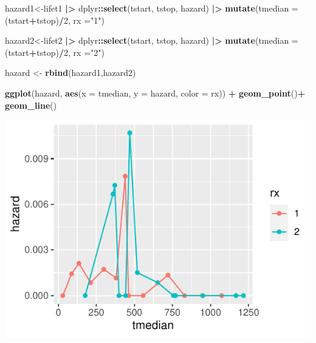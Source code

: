 \documentclass[
]{article}
\newenvironment{Shaded}{\begin{snugshade}}{\end{snugshade}}
\newcommand{\AttributeTok}[1]{\textcolor[rgb]{0.13,0.29,0.53}{#1}}
\newcommand{\DecValTok}[1]{\textcolor[rgb]{0.00,0.00,0.81}{#1}}
\newcommand{\FunctionTok}[1]{\textcolor[rgb]{0.13,0.29,0.53}{\textbf{#1}}}
\newcommand{\NormalTok}[1]{#1}
\newcommand{\OtherTok}[1]{\textcolor[rgb]{0.56,0.35,0.01}{#1}}
\newcommand{\SpecialCharTok}[1]{\textcolor[rgb]{0.81,0.36,0.00}{\textbf{#1}}}
\newcommand{\StringTok}[1]{\textcolor[rgb]{0.31,0.60,0.02}{#1}}
\begin{document}
\begin{Shaded}
\begin{Highlighting}[]
\NormalTok{hazard1}\OtherTok{\textless{}{-}}\NormalTok{lifet1 }\SpecialCharTok{|\textgreater{}}
\NormalTok{  dplyr}\SpecialCharTok{::}\FunctionTok{select}\NormalTok{(tstart, tstop, hazard) }\SpecialCharTok{|\textgreater{}}
  \FunctionTok{mutate}\NormalTok{(}\AttributeTok{tmedian =}\NormalTok{ (tstart}\SpecialCharTok{+}\NormalTok{tstop)}\SpecialCharTok{/}\DecValTok{2}\NormalTok{, }\AttributeTok{rx =}\StringTok{"1"}\NormalTok{)}

\NormalTok{hazard2}\OtherTok{\textless{}{-}}\NormalTok{lifet2 }\SpecialCharTok{|\textgreater{}}
\NormalTok{  dplyr}\SpecialCharTok{::}\FunctionTok{select}\NormalTok{(tstart, tstop, hazard) }\SpecialCharTok{|\textgreater{}}
  \FunctionTok{mutate}\NormalTok{(}\AttributeTok{tmedian =}\NormalTok{ (tstart}\SpecialCharTok{+}\NormalTok{tstop)}\SpecialCharTok{/}\DecValTok{2}\NormalTok{, }\AttributeTok{rx =}\StringTok{"2"}\NormalTok{)}

\NormalTok{hazard }\OtherTok{\textless{}{-}} \FunctionTok{rbind}\NormalTok{(hazard1,hazard2)}
\end{Highlighting}
\end{Shaded}

\begin{Shaded}
\begin{Highlighting}[]
\FunctionTok{ggplot}\NormalTok{(hazard, }\FunctionTok{aes}\NormalTok{(}\AttributeTok{x =}\NormalTok{ tmedian, }\AttributeTok{y =}\NormalTok{ hazard, }\AttributeTok{color =}\NormalTok{ rx)) }\SpecialCharTok{+}
  \FunctionTok{geom\_point}\NormalTok{()}\SpecialCharTok{+}
  \FunctionTok{geom\_line}\NormalTok{()}
\end{Highlighting}
\end{Shaded}

\begin{center}\includegraphics{Problem3_files/figure-latex/unnamed-chunk-4-1} \end{center}
\end{document}
